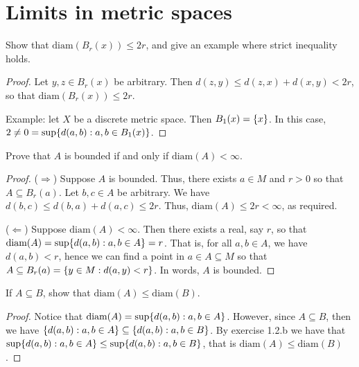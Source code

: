 \section{Limits in metric spaces}


\begin{exercise}{27}
Show that $\text{diam}(B_r(x))\leq 2r$, and give an example where strict inequality holds.
\end{exercise}
\begin{proof}
Let $y,z\in B_r(x)$ be arbitrary. Then $d(z,y)\leq d(z,x)+d(x,y)<2r$, so that $\text{diam}(B_r(x))\leq 2r$. 

Example: let $X$ be a discrete metric space. Then $B_1(x)=\{x\}$. In this case, $2\neq 0=\sup\{d(a,b):a,b\in B_1(x)\}$.
\end{proof} 

\begin{exercise}{29}
Prove that $A$ is bounded if and only if $\text{diam}(A)<\infty$.
\end{exercise}
\begin{proof}
($\Rightarrow$) Suppose $A$ is bounded. Thus, there exists $a\in M$ and $r>0$ so that $A\subseteq B_r(a)$. Let $b,c\in A$ be arbitrary. We have $d(b,c)\leq d(b,a)+d(a,c)\leq 2r$. Thus, $\text{diam}(A)\leq 2r<\infty$, as required.

($\Leftarrow$) Suppose $\text{diam}(A)<\infty$. Then there exists a real, say $r$, so that $\text{diam}(A) =\sup\{d(a,b):a,b\in A\} =r$. That is, for all $a,b\in A$, we have $d(a,b)<r$, hence we can find a point in $a\in A\subseteq M$ so that $A\subseteq B_r(a)=\{y\in M:d(a,y)<r\}$. In words, $A$ is bounded.
\end{proof} 

\begin{exercise}{30}
If $A\subseteq B$, show that $\text{diam}(A)\leq\text{diam}(B)$.
\end{exercise}
\begin{proof}
Notice that $\text{diam}(A) =\sup\{d(a,b):a,b\in A\}$. However, since $A\subseteq B$, then we have $\{d(a,b):a,b\in A\} \subseteq\{d(a,b):a,b\in B\}$. By exercise 1.2.b we have that $\sup\{d(a,b):a,b\in A\} \leq\sup\{d(a,b):a,b\in B\}$, that is $\text{diam}(A) \leq\text{diam}(B)$.
\end{proof} 

